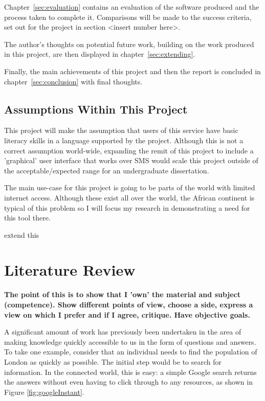 \documentclass{article}
\begin{document}
Chapter~\ref{sec:evaluation} contains an evaluation of the software produced and the process taken to complete it.  Comparisons will be made to the success criteria, set out for the project in section <insert number here>.

The author's thoughts on potential future work, building on the work produced in this project, are then displayed in chapter~\ref{sec:extending}.  

Finally, the main achievements of this project and then the report is concluded in chapter~\ref{sec:conclusion} with final thoughts.


\subsection{Assumptions Within This Project}
This project will make the assumption that users of this service have basic literacy skills in a language supported by the project.  Although this is not a correct assumption world-wide, expanding the remit of this project to include a 'graphical' user interface that works over SMS would scale this project outside of the acceptable/expected range for an undergraduate dissertation.

The main use-case for this project is going to be parts of the world with limited internet access.  Although these exist all over the world, the African continent is typical of this problem so I will focus my research in demonstrating a need for this tool there.

{\color{red} extend this}

\newpage

\section{Literature Review}
\label{sec:literatureReview}

{\bf The point of this is to show that I 'own' the material and subject (competence).  Show different points of view, choose a side, express a view on which I prefer and if I agree, critique.  Have objective goals.}

A significant amount of work has previously been undertaken in the area of making knowledge quickly accessible to us in the form of questions and answers.  To take one example, consider that an individual needs to find the population of London as quickly as possible.  The initial step would be to search for information.  In the connected world, this is easy: a simple Google search returns the answers without even having to click through to any resources, as shown in Figure \ref{fig:googleInstant}.
\end{document}
